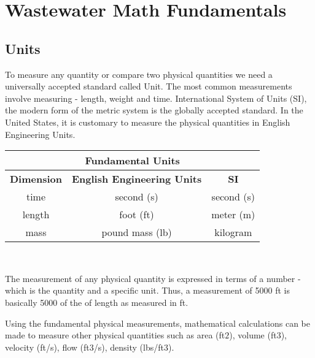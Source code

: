 


\chapter{Wastewater Math Fundamentals}

\section{Units}

To measure any quantity or compare two physical quantities we need a universally accepted standard called Unit. The most common measurements involve measuring - length, weight and time.   International System of Units (SI), the modern form of the metric system is the globally accepted standard.  In the United States, it is customary to measure the physical quantities in English Engineering Units.\\
\vspace{0.5cm}
\begin{tabular}{c c c }
\hline
\multicolumn{3}{c}{\textbf{Fundamental Units}} \\
\hline
\textbf{Dimension} & \textbf{English Engineering Units} & \textbf{SI}\\
\hline
time & second (s) & second (s) \\
length & foot (ft) & meter (m)\\
mass & pound mass (lb) & kilogram\\
\end{tabular}\\

\vspace{0.5cm}

The measurement of any physical quantity is expressed in terms of a number - which is the quantity and a specific unit.  
Thus, a measurement of 5000 ft is basically 5000 of the of length as measured in ft.

Using the fundamental physical measurements, mathematical calculations can be made to measure other physical quantities such as area (ft$2$), volume (ft$3$), velocity (ft/s), flow (ft$3$/s), density (lbs/ft$3$).

